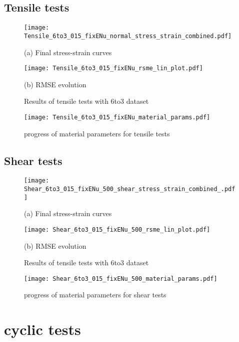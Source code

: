 \subsection{Tensile tests}
\begin{figure}[H]
    \centering
    \begin{minipage}[t]{0.495\textwidth}
        \centering
        \texttt{[image: Tensile\_6to3\_015\_fixENu\_normal\_stress\_strain\_combined.pdf]}
        \caption*{(a) Final stress-strain curves}
        \label{fig:tensileStressStrain6to3}
    \end{minipage}
    \hfill
    \begin{minipage}[t]{0.495\textwidth}
        \centering
        \texttt{[image: Tensile\_6to3\_015\_fixENu\_rsme\_lin\_plot.pdf]}
        \caption*{(b) RMSE evolution}
        \label{subfigure:tensileRMSE}
    \end{minipage}
    \caption{Results of tensile tests with 6to3 dataset}
    \label{fig:tensileResults6to3}
\end{figure}

\begin{figure}[H]
    \centering
    \texttt{[image: Tensile\_6to3\_015\_fixENu\_material\_params.pdf]}
    \caption{progress of material parameters for tensile tests}
    \label{fig:tensileMatParams}
\end{figure}


\subsection{Shear tests}
\begin{figure}[H]
    \centering
    \begin{minipage}[t]{0.495\textwidth}
        \centering
        \texttt{[image: Shear\_6to3\_015\_fixENu\_500\_shear\_stress\_strain\_combined\_.pdf]}
        \caption*{(a) Final stress-strain curves}
        \label{fig:shearStressStrain6to3}
    \end{minipage}
    \hfill
    \begin{minipage}[t]{0.495\textwidth}
        \centering
        \texttt{[image: Shear\_6to3\_015\_fixENu\_500\_rsme\_lin\_plot.pdf]}
        \caption*{(b) RMSE evolution}
        \label{subfigure:shearRMSE}
    \end{minipage}
    \caption{Results of tensile tests with 6to3 dataset}
    \label{fig:shearResults6to3}
\end{figure}


\begin{figure}[H]
    \centering
    \texttt{[image: Shear\_6to3\_015\_fixENu\_500\_material\_params.pdf]}
    \caption{progress of material parameters for shear tests}
    \label{fig:shearMatParams}
\end{figure}


\section{cyclic tests}







